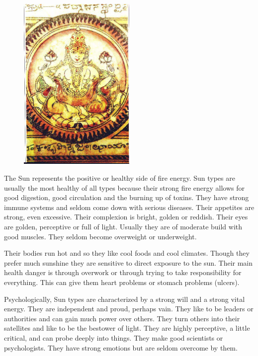  \begin{figure}[H]
 \centering
\includegraphics[width=0.5\textwidth]{pics/Sun_type.png}
 \end{figure}
 

The Sun represents the positive or healthy side of fire energy. Sun types are usually the most healthy of all types because their strong fire energy allows for good digestion, good circulation and the burning up of toxins. They have strong immune systems and seldom come down with serious diseases. Their appetites are strong, even excessive. Their complexion is bright, golden or reddish. Their eyes are golden, perceptive or full of light. Usually they are of moderate build with good muscles. They seldom become overweight or underweight.

 

Their bodies run hot and so they like cool foods and cool climates. Though they prefer much sunshine they are sensitive to direct exposure to the sun. Their main health danger is through overwork or through trying to take responsibility for everything. This can give them heart problems or stomach problems (ulcers).

 

Psychologically, Sun types are characterized by a strong will and a strong vital energy. They are independent and proud, perhaps vain. They like to be leaders or authorities and can gain much power over others. They turn others into their satellites and like to be the bestower of light. They are highly perceptive, a little critical, and can probe deeply into things. They make good scientists or psychologists. They have strong emotions but are seldom overcome by them.

